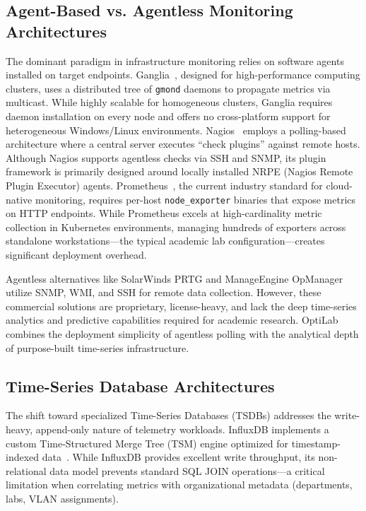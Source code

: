 \documentclass{ieeeaccess}
\begin{document}
\subsection{Agent-Based vs. Agentless Monitoring Architectures}
The dominant paradigm in infrastructure monitoring relies on software agents installed on target endpoints. Ganglia~\cite{distributed_monitoring}, designed for high-performance computing clusters, uses a distributed tree of \texttt{gmond} daemons to propagate metrics via multicast. While highly scalable for homogeneous clusters, Ganglia requires daemon installation on every node and offers no cross-platform support for heterogeneous Windows/Linux environments. Nagios~\cite{nagios} employs a polling-based architecture where a central server executes ``check plugins'' against remote hosts. Although Nagios supports agentless checks via SSH and SNMP, its plugin framework is primarily designed around locally installed NRPE (Nagios Remote Plugin Executor) agents. Prometheus~\cite{prometheus}, the current industry standard for cloud-native monitoring, requires per-host \texttt{node\_exporter} binaries that expose metrics on HTTP endpoints. While Prometheus excels at high-cardinality metric collection in Kubernetes environments, managing hundreds of exporters across standalone workstations---the typical academic lab configuration---creates significant deployment overhead.

Agentless alternatives like SolarWinds PRTG and ManageEngine OpManager utilize SNMP, WMI, and SSH for remote data collection. However, these commercial solutions are proprietary, license-heavy, and lack the deep time-series analytics and predictive capabilities required for academic research. OptiLab combines the deployment simplicity of agentless polling with the analytical depth of purpose-built time-series infrastructure.

\subsection{Time-Series Database Architectures}
The shift toward specialized Time-Series Databases (TSDBs) addresses the write-heavy, append-only nature of telemetry workloads. InfluxDB implements a custom Time-Structured Merge Tree (TSM) engine optimized for timestamp-indexed data~\cite{tsdb_survey}. While InfluxDB provides excellent write throughput, its non-relational data model prevents standard SQL JOIN operations---a critical limitation when correlating metrics with organizational metadata (departments, labs, VLAN assignments). 
\end{document}
